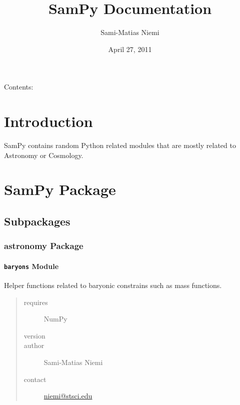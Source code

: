 \documentclass[letterpaper,10pt,english]{sphinxmanual}
\title{SamPy Documentation}
\date{April 27, 2011}
\author{Sami-Matias Niemi}
\begin{document}
\maketitle
\tableofcontents
{}\label{index::doc}


Contents:


\chapter{Introduction}
\label{intro:introduction}\label{intro::doc}\label{intro:welcome-to-sampy-s-documentation}
SamPy contains random Python related modules that are mostly related to Astronomy or Cosmology.


\chapter{SamPy Package}
\label{SamPy::doc}\label{SamPy:sampy-package}

\section{Subpackages}
\label{SamPy:subpackages}

\subsection{astronomy Package}
\label{SamPy.astronomy:astronomy-package}\label{SamPy.astronomy::doc}

\subsubsection{\texttt{baryons} Module}
\label{SamPy.astronomy:module-SamPy.astronomy.baryons}\label{SamPy.astronomy:baryons-module}
Helper functions related to baryonic constrains such as mass functions.
\begin{quote}\begin{description}
\item[{requires}] \leavevmode
NumPy

\item[{version}] 

\item[{author}] \leavevmode
Sami-Matias Niemi

\item[{contact}] \leavevmode
\href{mailto:niemi@stsci.edu}{niemi@stsci.edu}

\end{description}\end{quote}
\end{document}
